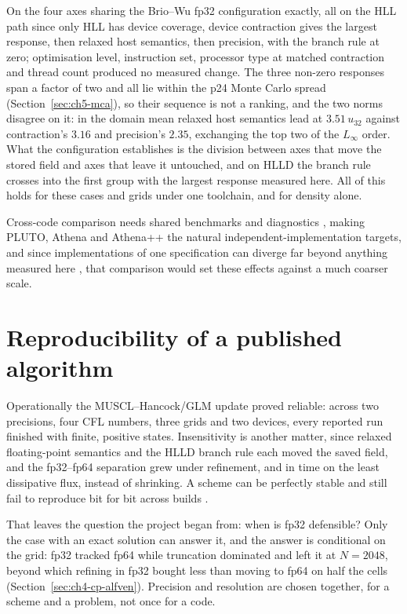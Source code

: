 On the four axes sharing the Brio--Wu fp32 configuration exactly, all on the
HLL path since only HLL has device coverage, device contraction gives the
largest response, then relaxed host semantics, then precision, with the branch
rule at zero; optimisation level, instruction set, processor type at matched
contraction and thread count produced no measured change. The three non-zero
responses span a factor of two and all lie within the p24 Monte Carlo spread
(Section~\ref{sec:ch5-mca}), so their sequence is not a ranking, and the two
norms disagree on it: in the domain mean relaxed host semantics lead at
$3.51\,u_{32}$ against contraction's $3.16$ and precision's $2.35$, exchanging
the top two of the $L_\infty$ order. What the configuration establishes is the
division between axes that move the stored field and axes that leave it
untouched, and on HLLD the branch rule crosses into the first group with the
largest response measured here. All of this holds for these cases and grids
under one toolchain, and for density alone.

Cross-code comparison needs shared benchmarks and diagnostics
\citep{kritsukEtAl2011comparison}, making PLUTO, Athena and Athena++
\citep{mignoneEtAl2007pluto,stoneEtAl2008athena,stoneEtAl2020athenapp,
greteEtAl2021kathena} the natural independent-implementation targets, and since
implementations of one specification can diverge far beyond anything measured
here \citep{hatton1997tExperiments}, that comparison would set these effects
against a much coarser scale.

\section{Reproducibility of a published algorithm}
\label{sec:ch6-published-algorithm}

Operationally the MUSCL--Hancock/GLM update proved reliable: across two
precisions, four CFL numbers, three grids and two devices, every reported run
finished with finite, positive states. Insensitivity is another matter, since
relaxed floating-point semantics and the HLLD branch rule each moved the saved
field, and the fp32--fp64 separation grew under refinement, and in time on the
least dissipative flux, instead of shrinking. A scheme can be perfectly stable
and still fail to reproduce bit for bit across builds
\citep{mesnardBarba2017cfd}.

That leaves the question the project began from: when is fp32 defensible? Only
the case with an exact solution can answer it, and the answer is conditional on
the grid: fp32 tracked fp64 while truncation dominated and left it at $N=2048$,
beyond which refining in fp32 bought less than moving to fp64 on half the cells
(Section~\ref{sec:ch4-cp-alfven}). Precision and resolution are chosen together,
for a scheme and a problem, not once for a code.

